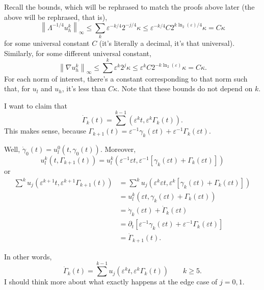 \documentclass[11pt]{amsart}
\theoremstyle{remark}
\newcommand{\eps}{\varepsilon}
\newcommand{\norm}[1]{\left\lVert#1\right\rVert}
\newcommand{\bracket}[1]{\left[ #1 \right]}
\newcommand{\del}{\partial}
\newcommand{\grad}{\nabla}
\newcommand{\n}{^{-1}}
\newcommand{\ulow}{u_l}
\newcommand{\uhigh}{u_h}
\newcommand{\ulowth}[1]{\ulow^{#1}}
\newcommand{\uhighth}[1]{\uhigh^{#1}}
\begin{document}
Recall the bounds, which will be rephrased to match the proofs above later (the above will be rephrased, that is),
\[ \norm{\Lambda^{-1/4} \uhighth{k} }_\infty \leq \sum_k \eps^{-k/4} 2^{-j/4} \kappa \leq \eps^{-k/4} C 2^{k \ln_2(\eps) /4} \kappa = C \kappa \]
for some universal constant $C$ (it's literally a decimal, it's that universal).  Similarly, for some different universal constant,
\[ \norm{\grad \uhighth{k} }_\infty \leq \sum^k \eps^{k} 2^{j} \kappa \leq \eps^{k} C 2^{-k \ln_2(\eps)} \kappa = C \kappa. \]
For each norm of interest, there's a constant corresponding to that norm such that, for $\ulow$ and $\uhigh$, it's less than $C \kappa$.  Note that these bounds do not depend on $k$.  

I want to claim that 
\[ \dot{\Gamma}_k(t) = \sum^{k-1} (\eps^k t, \eps^k \Gamma_k(t)). \]
This makes sense, because $\Gamma_{k+1}(t) = \eps\n \gamma_k(\eps t) + \eps\n \Gamma_k(\eps t)$.  

Well, $\dot{\gamma}_0(t) = \ulowth{0}(t,\gamma_0(t))$.  Moreover, 
\[ \ulowth{k}(t,\Gamma_{k+1}(t)) = \ulowth{k}(\eps\n \eps t, \eps\n \bracket{\gamma_k(\eps t) + \Gamma_k(\eps t)}) \]
or
\begin{align*} 
\sum^k u_j(\eps^{k+1} t, \eps^{k+1} \Gamma_{k+1}(t)) &= \sum^k u_j(\eps^k \eps t, \eps^k \bracket{\gamma_k(\eps t) + \Gamma_k(\eps t)})
\\ &= \ulowth{k}(\eps t, \gamma_k(\eps t) + \Gamma_k(\eps t))
\\ &= \dot{\gamma}_k(\eps t) + \dot{\Gamma}_k(\eps t)
\\ &= \del_t \bracket{\eps\n \gamma_k(\eps t) + \eps\n \Gamma_k(\eps t)}
\\ &= \dot{\Gamma}_{k+1}(t).
\end{align*}

In other words,
\[ \dot{\Gamma}_k(t) = \sum^{k-1} u_j(\eps^k t, \eps^k \Gamma_k(t)) \qquad k \geq 5. \]
I should think more about what exactly happens at the edge case of $j=0,1$.  
\end{document}
